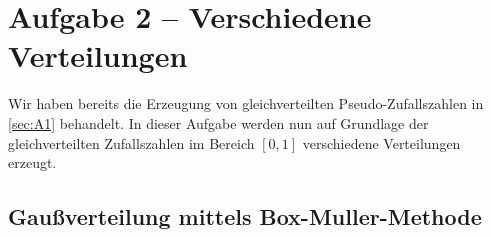 \section{Aufgabe 2 – Verschiedene Verteilungen}
\label{sec:A2}
Wir haben bereits die Erzeugung von gleichverteilten Pseudo-Zufallszahlen in \autoref{sec:A1} behandelt.
In dieser Aufgabe werden nun auf Grundlage der gleichverteilten Zufallszahlen im Bereich $[0,1]$ verschiedene Verteilungen erzeugt.

\subsection{Gaußverteilung mittels Box-Muller-Methode}
